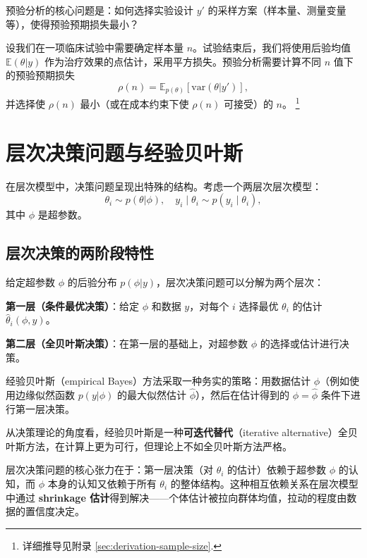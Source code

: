 预验分析的核心问题是：如何选择实验设计 $y'$ 的采样方案（样本量、测量变量等），使得预验预期损失最小？

\begin{Example}[样本量确定]\label{ex:sample-size}
  设我们在一项临床试验中需要确定样本量 $n$。试验结束后，我们将使用后验均值 $\mathbb{E}(\theta | y)$ 作为治疗效果的点估计，采用平方损失。预验分析需要计算不同 $n$ 值下的预验预期损失
  \[
  \rho(n) = \mathbb{E}_{p(\theta)}[\text{var}(\theta | y')],
  \]
  并选择使 $\rho(n)$ 最小（或在成本约束下使 $\rho(n)$ 可接受）的 $n$。
  \footnote{详细推导见附录 \cref{sec:derivation-sample-size}.}
\end{Example}

\section{层次决策问题与经验贝叶斯}

在层次模型中，决策问题呈现出特殊的结构。考虑一个两层次层次模型：
\[
\theta_i \sim p(\theta | \phi), \quad y_i \mid \theta_i \sim p(y_i \mid \theta_i),
\]
其中 $\phi$ 是超参数。

\subsection{层次决策的两阶段特性}

给定超参数 $\phi$ 的后验分布 $p(\phi | y)$，层次决策问题可以分解为两个层次：

\textbf{第一层（条件最优决策）}：给定 $\phi$ 和数据 $y$，对每个 $i$ 选择最优 $\theta_i$ 的估计 $\hat{\theta}_i(\phi, y)$。

\textbf{第二层（全贝叶斯决策）}：在第一层的基础上，对超参数 $\phi$ 的选择或估计进行决策。

经验贝叶斯（empirical Bayes）方法采取一种务实的策略：用数据估计 $\phi$（例如使用边缘似然函数 $p(y | \phi)$ 的最大似然估计 $\hat{\phi}$），然后在估计得到的 $\phi = \hat{\phi}$ 条件下进行第一层决策。

从决策理论的角度看，经验贝叶斯是一种\textbf{可迭代替代}（iterative alternative）全贝叶斯方法，在计算上更为可行，但理论上不如全贝叶斯方法严格。

\begin{Remark}
  层次决策问题的核心张力在于：第一层决策（对 $\theta_i$ 的估计）依赖于超参数 $\phi$ 的认知，而 $\phi$ 本身的认知又依赖于所有 $\theta_i$ 的整体结构。这种相互依赖关系在层次模型中通过\textbf{ shrinkage 估计}得到解决——个体估计被拉向群体均值，拉动的程度由数据的置信度决定。
\end{Remark}

